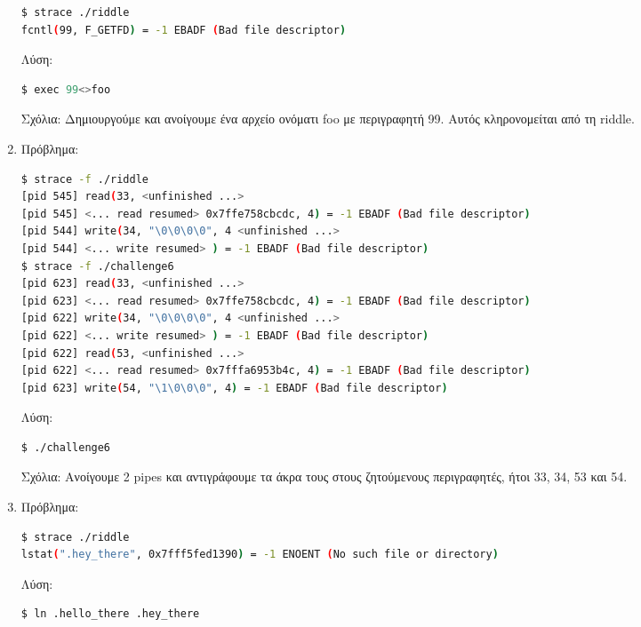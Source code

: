 \documentclass[12pt,titlepage]{article}
\newcommand{\en}{\textlatin}
\begin{document}
\begin{enumerate}
\latintext
\begin{lstlisting}[language=bash]
$ strace ./riddle
fcntl(99, F_GETFD) = -1 EBADF (Bad file descriptor)
\end{lstlisting}
\greektext

Λύση:

\latintext
\begin{lstlisting}[language=bash]
$ exec 99<>foo
\end{lstlisting}
\greektext

Σχόλια: Δημιουργούμε και ανοίγουμε ένα αρχείο ονόματι \en{foo} με περιγραφητή 99. Αυτός κληρονομείται από τη \en{riddle}.

\item

Πρόβλημα:

\latintext
\begin{lstlisting}[language=bash]
$ strace -f ./riddle
[pid 545] read(33, <unfinished ...>
[pid 545] <... read resumed> 0x7ffe758cbcdc, 4) = -1 EBADF (Bad file descriptor)
[pid 544] write(34, "\0\0\0\0", 4 <unfinished ...>
[pid 544] <... write resumed> ) = -1 EBADF (Bad file descriptor)
$ strace -f ./challenge6
[pid 623] read(33, <unfinished ...>
[pid 623] <... read resumed> 0x7ffe758cbcdc, 4) = -1 EBADF (Bad file descriptor)
[pid 622] write(34, "\0\0\0\0", 4 <unfinished ...>
[pid 622] <... write resumed> ) = -1 EBADF (Bad file descriptor)
[pid 622] read(53, <unfinished ...>
[pid 622] <... read resumed> 0x7fffa6953b4c, 4) = -1 EBADF (Bad file descriptor)
[pid 623] write(54, "\1\0\0\0", 4) = -1 EBADF (Bad file descriptor)
\end{lstlisting}
\greektext

Λύση:

\latintext
\begin{lstlisting}[language=bash]
$ ./challenge6
\end{lstlisting}
\greektext

Σχόλια: Ανοίγουμε 2 \en{pipes} και αντιγράφουμε τα άκρα τους στους ζητούμενους περιγραφητές, ήτοι 33, 34, 53 και 54.

\item

Πρόβλημα:

\latintext
\begin{lstlisting}[language=bash]
$ strace ./riddle
lstat(".hey_there", 0x7fff5fed1390) = -1 ENOENT (No such file or directory)
\end{lstlisting}
\greektext

Λύση:

\latintext
\begin{lstlisting}[language=bash]
$ ln .hello_there .hey_there
\end{lstlisting}
\greektext


\end{enumerate}
\end{document}
